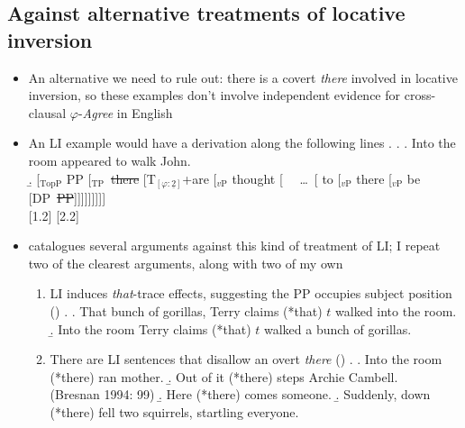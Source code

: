 \documentclass[letterpaper,10pt]{handout_nick}
\begin{document}
\subsection{Against alternative treatments of locative inversion}
\begin{itemize}
\item An alternative we need to rule out: there is a covert \emph{there} involved in locative inversion, so these examples don't involve independent evidence for cross-clausal $\varphi$-\emph{Agree} in English
\item An LI example would have a derivation along the following lines
\ex. \ex. \a. Into the room appeared to walk John.\\
\b. [$_\text{TopP}$ \hspace*{-.3cm}PP  [$_\text{TP}$\  \hspace*{-.3cm}\st{there} [\hspace*{-.2cm}T$_{[\varphi:\underline{2}]}$+are [$_\text{$v$P}$ thought [ \ \ \ldots\ [ to [$_\text{$v$P}$ \hspace*{-.4cm}there [$_\text{$v$P}$ be [\hspace*{-.3cm}DP\ \hspace*{-.3cm}\st{PP}]]]]]]]]]\\
[1.2]
[2.2]

\item \citet{bresnan94} catalogues several arguments against this kind of treatment of LI; I repeat two of the clearest arguments, along with two of my own
\begin{enumerate}
\item LI induces \emph{that}-trace effects, suggesting the PP occupies subject position (\citealt{bresnan79})
\ex. \a. That bunch of gorillas, Terry claims (*that) $t$ walked into the room.
\b. Into the room Terry claims (*that) $t$ walked a bunch of gorillas.

\item There are LI sentences that disallow an overt \emph{there} (\citealt{bresnan94})
\ex. \a. Into the room (*there) ran mother.
\b. Out of it (*there) steps Archie Cambell.\\
(Bresnan 1994: 99)
\b. Here (*there) comes someone.
\b. Suddenly, down (*there) fell two squirrels, startling everyone.


\end{enumerate}
\end{itemize}
\end{document}
